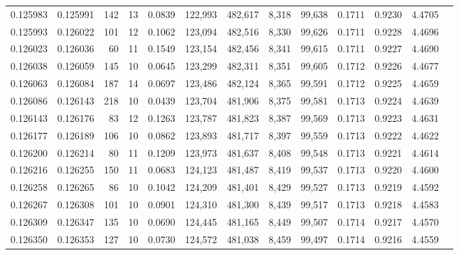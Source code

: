\begin{tabular}{rrrrrrrrrrrrr}
0.125983 & 0.125991 &   142 &  13 &                                     0.0839 & 122,993 & 482,617 &   8,318 &  99,638 & 0.1711 & 0.9230 & 4.4705 \\
0.125993 & 0.126022 &   101 &  12 &                                     0.1062 & 123,094 & 482,516 &   8,330 &  99,626 & 0.1711 & 0.9228 & 4.4696 \\
0.126023 & 0.126036 &    60 &  11 &                                     0.1549 & 123,154 & 482,456 &   8,341 &  99,615 & 0.1711 & 0.9227 & 4.4690 \\
0.126038 & 0.126059 &   145 &  10 &                                     0.0645 & 123,299 & 482,311 &   8,351 &  99,605 & 0.1712 & 0.9226 & 4.4677 \\
0.126063 & 0.126084 &   187 &  14 &                                     0.0697 & 123,486 & 482,124 &   8,365 &  99,591 & 0.1712 & 0.9225 & 4.4659 \\
0.126086 & 0.126143 &   218 &  10 &                                     0.0439 & 123,704 & 481,906 &   8,375 &  99,581 & 0.1713 & 0.9224 & 4.4639 \\
0.126143 & 0.126176 &    83 &  12 &                                     0.1263 & 123,787 & 481,823 &   8,387 &  99,569 & 0.1713 & 0.9223 & 4.4631 \\
0.126177 & 0.126189 &   106 &  10 &                                     0.0862 & 123,893 & 481,717 &   8,397 &  99,559 & 0.1713 & 0.9222 & 4.4622 \\
0.126200 & 0.126214 &    80 &  11 &                                     0.1209 & 123,973 & 481,637 &   8,408 &  99,548 & 0.1713 & 0.9221 & 4.4614 \\
0.126216 & 0.126255 &   150 &  11 &                                     0.0683 & 124,123 & 481,487 &   8,419 &  99,537 & 0.1713 & 0.9220 & 4.4600 \\
0.126258 & 0.126265 &    86 &  10 &                                     0.1042 & 124,209 & 481,401 &   8,429 &  99,527 & 0.1713 & 0.9219 & 4.4592 \\
0.126267 & 0.126308 &   101 &  10 &                                     0.0901 & 124,310 & 481,300 &   8,439 &  99,517 & 0.1713 & 0.9218 & 4.4583 \\
0.126309 & 0.126347 &   135 &  10 &                                     0.0690 & 124,445 & 481,165 &   8,449 &  99,507 & 0.1714 & 0.9217 & 4.4570 \\
0.126350 & 0.126353 &   127 &  10 &                                     0.0730 & 124,572 & 481,038 &   8,459 &  99,497 & 0.1714 & 0.9216 & 4.4559 \\

\end{tabular}
